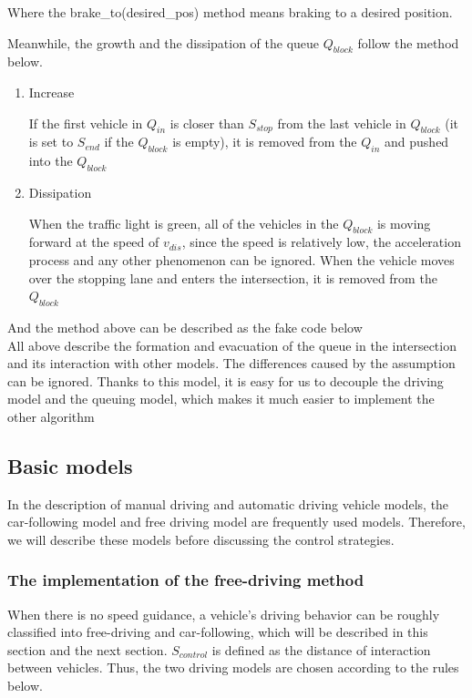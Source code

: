 \documentclass[a4paper,UTF8]{paper}
\begin{document}


Where the brake\_to(desired\_pos) method means braking to a desired position.

Meanwhile, the growth and the dissipation of the queue $Q_{block}$ follow the method below.

\begin{enumerate}
\item Increase

If the first vehicle in $Q_{in}$ is closer than $S_{stop}$ from the last vehicle in $Q_{block}$ (it is set to $S_{end}$ if the $Q_{block}$ is empty), it is removed from the $Q_{in}$ and pushed into the $Q_{block}$

\item Dissipation

When the traffic light is green, all of the vehicles in the $Q_{block}$ is moving forward at the speed of $v_{dis}$, since the speed is relatively low, the acceleration process and any other phenomenon can be ignored. When the vehicle moves over the stopping lane and enters the intersection, it is removed from the $Q_{block}$
\end{enumerate}
And the method above can be described as the fake code below\\



All above describe the formation and evacuation of the queue in the intersection and its interaction with other models. The differences caused by the assumption can be ignored. Thanks to this model, it is easy for us to decouple the driving model and the queuing model, which makes it much easier to implement the other algorithm
\subsection{Basic models}
In the description of manual driving and automatic driving vehicle models, the car-following model and free driving model are frequently used models. Therefore, we will describe these models before discussing the control strategies.

\subsubsection{The implementation of the free-driving method}

When there is no speed guidance, a vehicle's driving behavior can be roughly classified into free-driving and car-following, which will be described in this section and the next section. $S_{control}$ is defined as the distance of interaction between vehicles. Thus, the two driving models are chosen according to the rules below.
\end{document}
